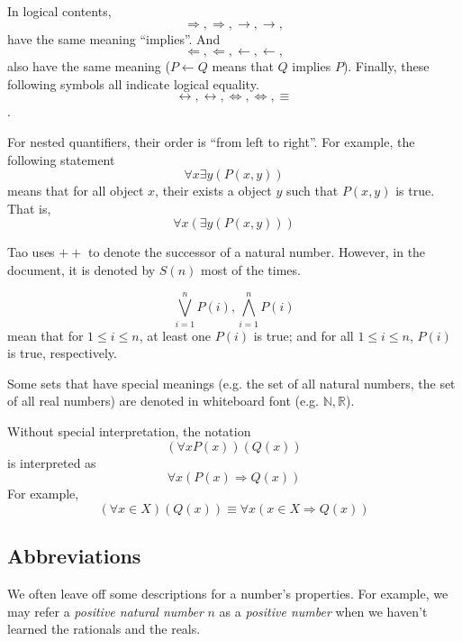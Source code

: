 In logical contents, 
\[
\Longrightarrow, \Rightarrow, \longrightarrow, \rightarrow, 
\]
have the same meaning ``implies''. And 
\[
\Longleftarrow, \Leftarrow, \longleftarrow, \leftarrow,
\]
also have the same meaning ($P \leftarrow Q$ means that $Q$ implies $P$).
Finally, these following symbols all indicate logical equality.
\[
\leftrightarrow, \longleftrightarrow, \Leftrightarrow, \Longleftrightarrow, \equiv
\].

For nested quantifiers, their order is ``from left to right''. For example, the following statement 
\[
\forall x \exists y (P(x,y))
\]
means that for all object $x$, their exists a object $y$ such that $P(x,y)$ is true.
That is,
\[
\forall x(\exists y(P(x,y)))
\]

Tao uses $++$ to denote the successor of a natural number. However, in the document, it is denoted by 
$S(n)$ most of the times.

\[
\bigvee_{i=1}^{n} P(i), \bigwedge_{i=1}^{n} P(i)
\]
mean that for $1\leq i \leq n$, at least one $P(i)$ is true; and for all $1\leq i \leq n$, $P(i)$ is 
true, respectively.

Some sets that have special meanings (e.g. the set of all natural numbers, the set of all real numbers) 
are denoted in whiteboard font (e.g. $\mathbb{N}, \mathbb{R}$).

Without special interpretation, the notation
\[
(\forall x P(x))(Q(x))
\]
is interpreted as 
\[
\forall x(P(x) \Longrightarrow Q(x))
\]
For example, 
\[
(\forall x \in X)(Q(x)) \equiv \forall x(x \in X \Longrightarrow Q(x))
\]

\subsection{Abbreviations}
We often leave off some descriptions for a number's properties. For example, we may refer a 
\emph{positive natural number} $n$ as a \emph{positive number} when we haven't learned the rationals and 
the reals.